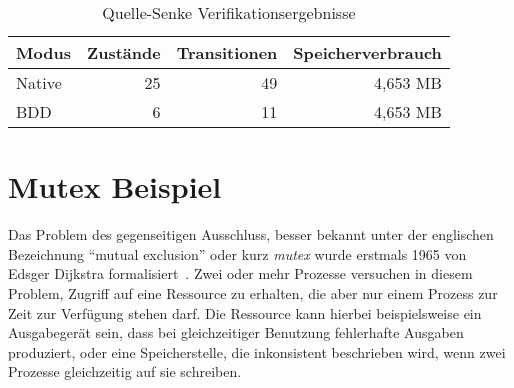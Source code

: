 \begin{table}
  \centering
  \begin{tabular}{|l|r|r|r|}
    \hline
    \textbf{Modus} & \textbf{Zustände} & \textbf{Transitionen} & \textbf{Speicherverbrauch}\\
    \hline
    Native & 25 & 49 & 4,653 MB\\
    BDD & 6 & 11 & 4,653 MB\\
    \hline
  \end{tabular}
  \caption{Quelle-Senke Verifikationsergebnisse}
  \label{tab:source_sink_verifikation}
\end{table}
\section{Mutex Beispiel}
Das Problem des gegenseitigen Ausschluss, besser bekannt unter der englischen Bezeichnung "`mutual exclusion"' oder kurz \emph{mutex} wurde erstmals 1965 von Edsger Dijkstra formalisiert~\cite{dijkstra_mutex}.
Zwei oder mehr Prozesse versuchen in diesem Problem, Zugriff auf eine Ressource zu erhalten, die aber nur einem Prozess zur Zeit zur Verfügung stehen darf.
Die Ressource kann hierbei beispielsweise ein Ausgabegerät sein, dass bei gleichzeitiger Benutzung fehlerhafte Ausgaben produziert, oder eine Speicherstelle, die inkonsistent beschrieben wird, wenn zwei Prozesse gleichzeitig auf sie schreiben.

